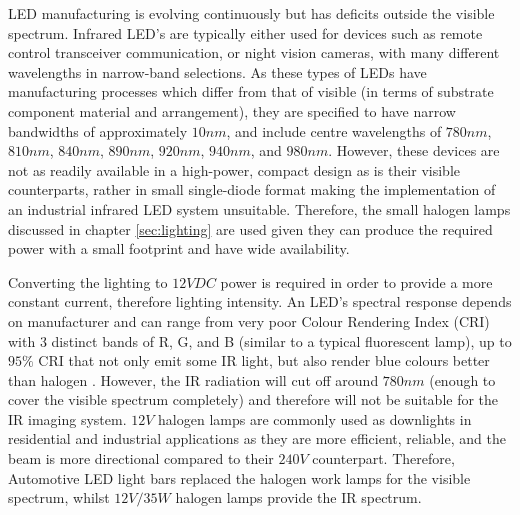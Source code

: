 \documentclass[fleqn,twoside,12pt]{report}
\begin{document}
LED manufacturing is evolving continuously but has deficits outside the visible spectrum. Infrared LED's are typically either used for devices such as remote control transceiver communication, or night vision cameras, with many different wavelengths in narrow-band selections. As these types of LEDs have manufacturing processes which differ from that of visible (in terms of substrate component material and arrangement), they are specified to have narrow bandwidths of approximately $10nm$, and include centre wavelengths of $780nm$, $810nm$, $840nm$, $890nm$, $920nm$, $940nm$, and $980nm$. However, these devices are not as readily available in a high-power, compact design as is their visible counterparts, rather in small single-diode format making the implementation of an industrial infrared LED system unsuitable. Therefore, the small halogen lamps discussed in chapter \ref{sec:lighting} are used given they can produce the required power with a small footprint and have wide availability. 


Converting the lighting to $12VDC$ power is required in order to provide a more constant current, therefore lighting intensity. An LED's spectral response depends on manufacturer and can range from very poor Colour Rendering Index (CRI) with 3 distinct bands of R, G, and B (similar to a typical fluorescent lamp), up to $95\%$ CRI that not only emit some IR light, but also render blue colours better than halogen \cite{lumicrest}. However, the IR radiation will cut off around $780nm$ (enough to cover the visible spectrum completely) and therefore will not be suitable for the IR imaging system. $12V$ halogen lamps are commonly used as downlights in residential and industrial applications as they are more efficient, reliable, and the beam is more directional compared to their $240V$ counterpart. Therefore, Automotive LED light bars replaced the halogen work lamps for the visible spectrum, whilst $12V/35W$ halogen lamps provide the IR spectrum. 
\end{document}
